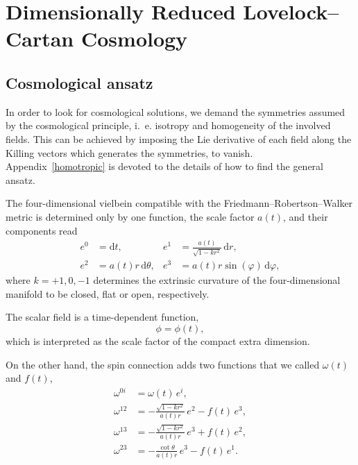 \documentclass[aps,prd,12pt,superscriptaddress,showpacs,showkeys,longbibliography,reprint,nofootinbib]{revtex4-1}
\begin{document}
\section{Dimensionally Reduced Lovelock--Cartan Cosmology\label{cosmos}}

\subsection{Cosmological ansatz}

In order to look for cosmological solutions, we demand the symmetries assumed by the cosmological principle, i.~e. isotropy and homogeneity of the involved fields. This can be achieved by imposing the Lie derivative of each field along the Killing vectors which generates the symmetries, to vanish. Appendix~\ref{homotropic} is devoted to the details of how to find the general ansatz.

The four-dimensional vielbein compatible with the Friedmann--Robertson--Walker metric is determined only by one function, the scale factor $a(t)$, and their components read
\begin{equation}
  \begin{aligned}
    \label{vielbein cosmo}
    e^0&=\mbox{d}t, & e^1&=\frac{a(t)}{\sqrt{1-kr^2}} \, \mbox{d}r,\\
    e^2&=a(t)r \, \mbox{d}\theta, & e^3&=a(t) r \sin(\varphi) \,\mbox{d}\varphi, 
  \end{aligned}
\end{equation}
where $k=+1,0,-1$ determines the extrinsic curvature of the four-dimensional manifold to be closed, flat or open, respectively. 

The scalar field is a time-dependent function, 
\begin{equation}
  \phi=\phi(t),
\end{equation}
which is interpreted as the scale factor of the compact extra dimension.

On the other hand, the spin connection adds two functions that we called $\omega(t)$ and $f(t)$,
\begin{align}
  \omega^{0i}&=\omega(t) \, e^i,\\
  \omega^{12}&=-\frac{\sqrt{1-kr^2}}{a(t)r} \, e^2 - f(t) \, e^3,\\
  \omega^{13}&=-\frac{\sqrt{1-kr^2}}{a(t)r} \, e^3 + f(t) \, e^2,\\
  \omega^{23}&=-\frac{\cot\theta}{a(t)r} \, e^3 - f(t) \, e^1.
\end{align}
\end{document}
